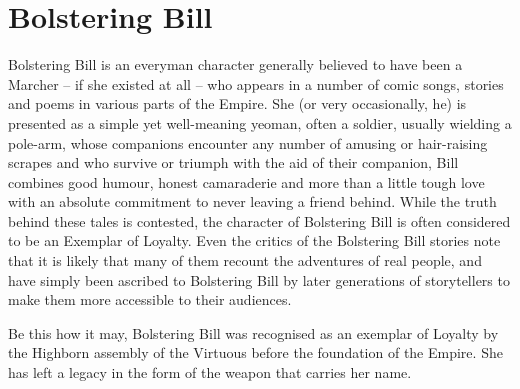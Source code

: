 \section{Bolstering Bill}
Bolstering Bill is an everyman character generally believed to have been a Marcher – if she existed at all – who appears in a number of comic songs, stories and poems in various parts of the Empire. She (or very occasionally, he) is presented as a simple yet well-meaning yeoman, often a soldier, usually wielding a pole-arm, whose companions encounter any number of amusing or hair-raising scrapes and who survive or triumph with the aid of their companion, Bill combines good humour, honest camaraderie and more than a little tough love with an absolute commitment to never leaving a friend behind. While the truth behind these tales is contested, the character of Bolstering Bill is often considered to be an Exemplar of Loyalty. Even the critics of the Bolstering Bill stories note that it is likely that many of them recount the adventures of real people, and have simply been ascribed to Bolstering Bill by later generations of storytellers to make them more accessible to their audiences.

Be this how it may, Bolstering Bill was recognised as an exemplar of Loyalty by the Highborn assembly of the Virtuous before the foundation of the Empire. She has left a legacy in the form of the weapon that carries her name.

